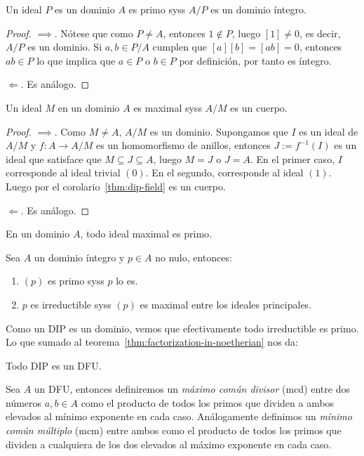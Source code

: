 \documentclass[11pt,oneside]{book}
\begin{document}
\begin{thm}
Un ideal $P$ es un dominio $A$ es primo syss $A/P$ es un dominio íntegro.
\end{thm}
\begin{proof}
$\implies$. Nótese que como $P\neq A$, entonces $1\notin P$, luego $[1]\neq 0$, es decir, $A/P$ es un dominio. Si $a,b\in P/A$ cumplen que $[a][b]=[ab]=0$, entonces $ab\in P$ lo que implica que $a\in P$ o $b\in P$ por definición, por tanto es íntegro.

$\Longleftarrow$. Es análogo.
\end{proof}
\begin{thm}
Un ideal $M$ en un dominio $A$ es maximal syss $A/M$ es un cuerpo.
\end{thm}
\begin{proof}
$\implies$. Como $M\neq A$, $A/M$ es un dominio. Supongamos que $I$ es un ideal de $A/M$ y $f:A\rightarrow A/M$ es un homomorfismo de anillos, entonces $J:=f^{-1}(I)$ es un ideal que satisface que $M\subseteq J\subseteq A$, luego $M=J$ o $J=A$. En el primer caso, $I$ corresponde al ideal trivial $(0)$. En el segundo, corresponde al ideal $(1)$. Luego por el corolario~\ref{thm:dip-field} es un cuerpo.

$\Longleftarrow$. Es análogo.
\end{proof}
\begin{cor}
En un dominio $A$, todo ideal maximal es primo.
\end{cor}
\begin{lem}
Sea $A$ un dominio íntegro y $p\in A$ no nulo, entonces:
\begin{enumerate}
	\item $(p)$ es primo syss $p$ lo es.
	\item $p$ es irreductible syss $(p)$ es maximal entre los ideales principales.
\end{enumerate}
\end{lem}
Como un DIP es un dominio, vemos que efectivamente todo irreductible es primo. Lo que sumado al teorema~\ref{thm:factorization-in-noetherian} nos da: 
\begin{thm}
Todo DIP es un DFU.
\end{thm}
\begin{mydef}
Sea $A$ un DFU, entonces definiremos un \textit{máximo común divisor} (mcd) entre dos números $a,b\in A$ como el producto de todos los primos que dividen a ambos elevados al mínimo exponente en cada caso. Análogamente definimos un \textit{mínimo común múltiplo} (mcm) entre ambos como el producto de todos los primos que dividen a cualquiera de los dos elevados al máximo exponente en cada caso.
\end{mydef}
\end{document}
